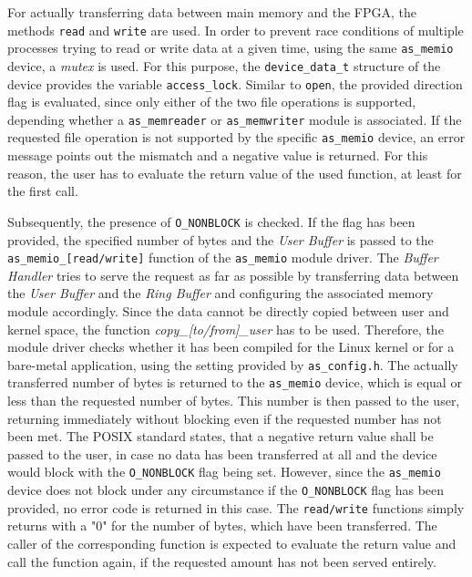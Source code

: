 For actually transferring data between main memory and the FPGA, the methods \texttt{read} and \texttt{write} are used.
In order to prevent race conditions of multiple processes trying to read or write data at a given time, using the same \texttt{as\_memio} device, a \textit{mutex} is used.
For this purpose, the \texttt{device\_data\_t} structure of the device provides the variable \texttt{access\_lock}.
Similar to \texttt{open}, the provided direction flag is evaluated, since only either of the two file operations is supported, depending whether a \texttt{as\_memreader} or \texttt{as\_memwriter} module is associated.
If the requested file operation is not supported by the specific \texttt{as\_memio} device, an error message points out the mismatch and a negative value is returned.
For this reason, the user has to evaluate the return value of the used function, at least for the first call.

Subsequently, the presence of \texttt{O\_NONBLOCK} is checked.
If the flag has been provided, the specified number of bytes and the \textit{User Buffer} is passed to the \texttt{as\_memio\_[read/write]} function of the \texttt{as\_memio} module driver.
The \textit{Buffer Handler} tries to serve the request as far as possible by transferring data between the \textit{User Buffer} and the \textit{Ring Buffer} and configuring the associated memory module accordingly.
Since the data cannot be directly copied between user and kernel space, the function  \textit{copy\_[to/from]\_user} has to be used.
Therefore, the module driver checks whether it has been compiled for the Linux kernel or for a bare-metal application, using the setting provided by \texttt{as\_config.h}.
The actually transferred number of bytes is returned to the \texttt{as\_memio} device, which is equal or less than the requested number of bytes.
This number is then passed to the user, returning immediately without blocking even if the requested number has not been met.
The POSIX standard states, that a negative return value shall be passed to the user, in case no data has been transferred at all and the device would block with the \texttt{O\_NONBLOCK} flag being set.
However, since the \texttt{as\_memio} device does not block under any circumstance if the \texttt{O\_NONBLOCK} flag has been provided, no error code is returned in this case.
The \texttt{read/write} functions simply returns with a "0" for the number of bytes, which have been transferred.
The caller of the corresponding function is expected to evaluate the return value and call the function again, if the requested amount has not been served entirely.

